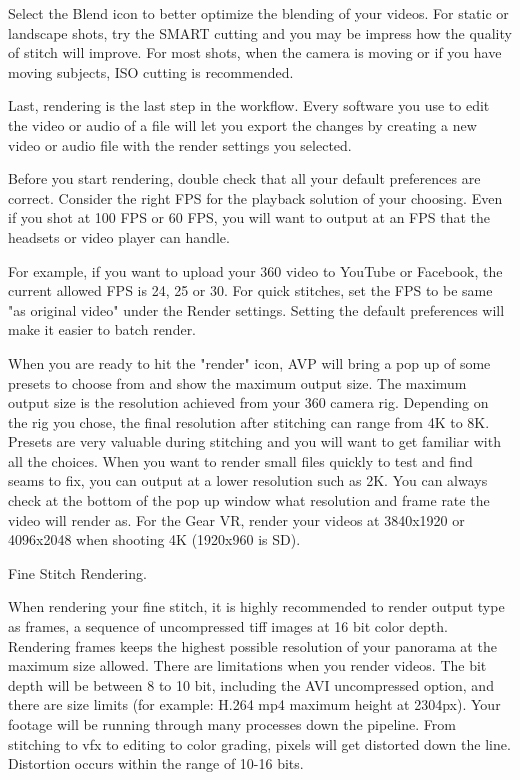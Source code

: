 \begin{fullwidth}
Select the Blend icon to better optimize the blending of your videos. For static or landscape shots, try the SMART cutting and you may be impress how the quality of stitch will improve. For most shots, when the camera is moving or if you have moving subjects, ISO cutting is recommended.

Last, rendering is the last step in the workflow. Every software you use to edit the video or audio of a file will let you export the changes by creating a new video or audio file with the render settings you selected.

Before you start rendering, double check that all your default preferences are correct. Consider the right FPS for the playback solution of your choosing. Even if you shot at 100 FPS or 60 FPS, you will want to output at an FPS that the headsets or video player can handle. 

For example, if you want to upload your 360 video to YouTube or Facebook, the current allowed FPS is 24, 25 or 30. For quick stitches, set the FPS to be same "as original video" under the Render settings. Setting the default preferences will make it easier to batch render.


When you are ready to hit the "render" icon, AVP will bring a pop up of some presets to choose from and show the maximum output size. The maximum output size is the resolution achieved from your 360 camera rig. Depending on the rig you chose, the final resolution after stitching can range from 4K to 8K. Presets are very valuable during stitching and you will want to get familiar with all the choices. When you want to render small files quickly to test and find seams to fix, you can output at a lower resolution such as 2K. You can always check at the bottom of the pop up window what resolution and frame rate the video will render as. For the Gear VR, render your videos at 3840x1920 or 4096x2048 when shooting 4K (1920x960 is SD).

{\large Fine Stitch Rendering. \par}

When rendering your fine stitch, it is highly recommended to render output type as frames, a sequence of uncompressed tiff images at 16 bit color depth. Rendering frames keeps the highest possible resolution of your panorama at the maximum size allowed. There are limitations when you render videos. The bit depth will be between 8 to 10 bit, including the AVI uncompressed option, and there are size limits (for example: H.264 mp4 maximum height at 2304px). Your footage will be running through many processes down the pipeline.
From stitching to vfx to editing to color grading, pixels will get distorted down the line. Distortion occurs within the range of 10-16 bits. 


\end{fullwidth}
